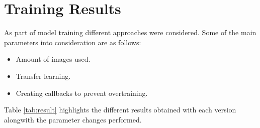 \section{Training Results}
\label{section:results}
As part of model training different approaches were considered. Some of the main parameters into consideration are as follows:
\begin{itemize}
    \item Amount of images used.
    \item Transfer learning.
    \item Creating callbacks to prevent overtraining.
\end{itemize}
Table \ref{tab:result} highlights the different results obtained with each version alongwith the parameter changes performed.\\
